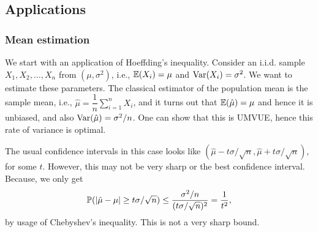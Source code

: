 \documentclass[12pt]{article}
\begin{document}
\begin{center}
\end{center}



\subsection{Applications}

\subsubsection{Mean estimation}

We start with an application of Hoeffding's inequality. Consider an i.i.d. sample \( X_1, X_2, \dots, X_n \) from $(\mu, \sigma^2)$, i.e., $\mathbb{E}(X_i) = \mu$ and $\mathrm{Var}(X_i) = \sigma^2$. We want to estimate these parameters. The classical estimator of the population mean is the sample mean, i.e., $\widehat{\mu} = \dfrac{1}{n}\sum_{i=1}^n X_i$, and it turns out that $\mathbb{E}(\hat{\mu}) = \mu$ and hence it is unbiased, and also $\mathrm{Var}(\hat{\mu}) = \sigma^2/n$. One can show that this is UMVUE, hence this rate of variance is optimal.

The usual confidence intervals in this case looks like $\left( \widehat{\mu} - t\sigma/\sqrt{n}, \widehat{\mu}+t\sigma/\sqrt{n} \right)$, for some $t$. However, this may not be very sharp or the best confidence interval. Because, we only get
\begin{equation*}
    \mathbb{P}(\vert \hat{\mu} - \mu\vert \geq t\sigma/\sqrt{n}) \leq \dfrac{\sigma^2/n}{(t\sigma/\sqrt{n})^2} = \dfrac{1}{t^2},
\end{equation*}
\noindent by usage of Chebyshev's inequality. This is not a very sharp bound.
\end{document}
